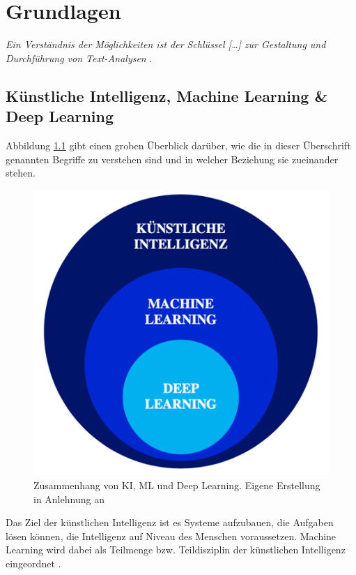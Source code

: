 \chapter{Grundlagen}
\label{grundlagen}

\textit{Ein Verständnis der Möglichkeiten ist der Schlüssel […] zur Gestaltung und Durchführung von Text-Analysen} \cite[S. vii]{Anandarajan}.

\section{Künstliche Intelligenz, Machine Learning \& Deep Learning}

Abbildung \ref{Abbildung:kelleher} gibt einen groben Überblick darüber, wie die in dieser Überschrift genannten Begriffe zu verstehen sind und in welcher Beziehung sie zueinander stehen. 

\begin{figure}[h]
\centering
\includegraphics[scale=1.0]{content/pics/Picture_2.png}
\caption{Zusammenhang von KI, ML und Deep Learning. Eigene Erstellung in Anlehnung an \cite{Kelleher}}
\label{Abbildung:kelleher}
\end{figure}

Das Ziel der künstlichen Intelligenz ist es Systeme aufzubauen, die Aufgaben lösen können, die Intelligenz auf Niveau des Menschen voraussetzen. Machine Learning wird dabei als Teilmenge bzw. Teildisziplin der künstlichen Intelligenz eingeordnet \cite[S. 14]{Gupta}.

